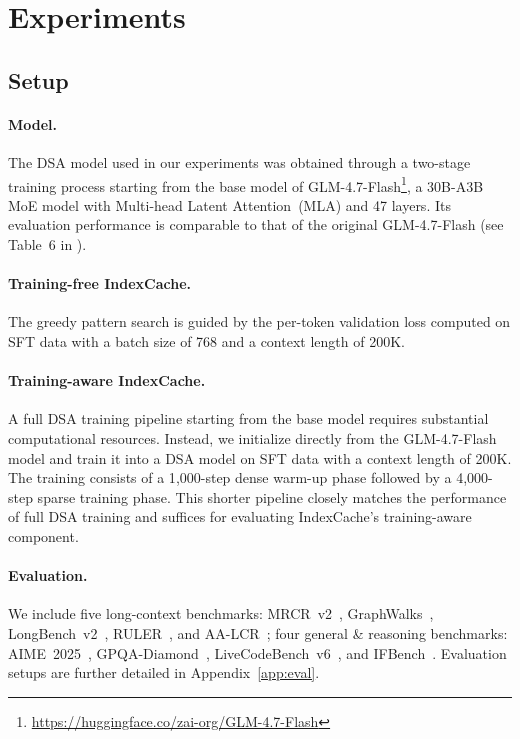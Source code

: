 \section{Experiments}
\label{sec:experiments}

\subsection{Setup}
\label{sec:exp-setup}

\paragraph{Model.}
The DSA model used in our experiments was obtained through a two-stage training process starting from the base model of GLM-4.7-Flash\footnote{\url{https://huggingface.co/zai-org/GLM-4.7-Flash}}, a 30B-A3B MoE model with Multi-head Latent Attention~(MLA) and 47 layers. Its evaluation performance is comparable to that of the original GLM-4.7-Flash (see Table~6 in \citet{glm5}).

\paragraph{Training-free IndexCache.}
The greedy pattern search is guided by the per-token validation loss computed on SFT data with a batch size of 768 and a context length of 200K.

\paragraph{Training-aware IndexCache.}
A full DSA training pipeline starting from the base model requires substantial computational resources. Instead, we initialize directly from the GLM-4.7-Flash model and train it into a DSA model on SFT data with a context length of 200K. The training consists of a 1{,}000-step dense warm-up phase followed by a 4{,}000-step sparse training phase. This shorter pipeline closely matches the performance of full DSA training and suffices for evaluating IndexCache's training-aware component.

\paragraph{Evaluation.}
We include five long-context benchmarks: MRCR~v2~\citep{mrcr}, GraphWalks~\citep{graphwalks}, LongBench~v2~\citep{longbenchv2}, RULER~\citep{ruler}, and AA-LCR~\citep{aalcr}; four general \& reasoning benchmarks: AIME~2025~\citep{aime2025}, GPQA-Diamond~\citep{gpqa}, LiveCodeBench~v6~\citep{livecodebench}, and IFBench~\citep{ifbench}.
Evaluation setups are further detailed in Appendix~\ref{app:eval}.

